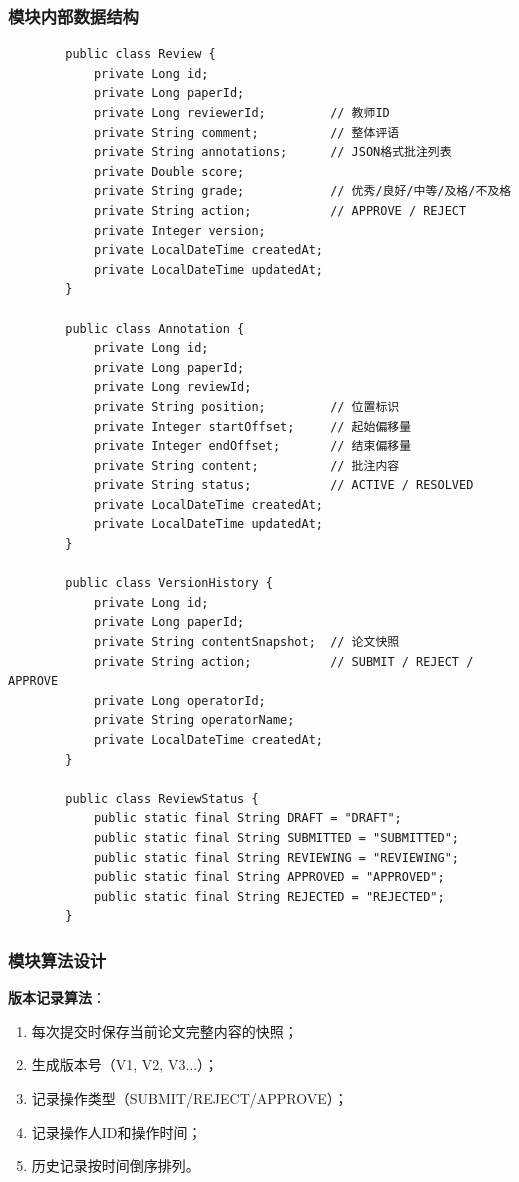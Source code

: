 \documentclass{../template/softeng}
\begin{document}
	\subsubsection{模块内部数据结构}
	\begin{verbatim}
		public class Review {
			private Long id;
			private Long paperId;
			private Long reviewerId;         // 教师ID
			private String comment;          // 整体评语
			private String annotations;      // JSON格式批注列表
			private Double score;
			private String grade;            // 优秀/良好/中等/及格/不及格
			private String action;           // APPROVE / REJECT
			private Integer version;
			private LocalDateTime createdAt;
			private LocalDateTime updatedAt;
		}

		public class Annotation {
			private Long id;
			private Long paperId;
			private Long reviewId;
			private String position;         // 位置标识
			private Integer startOffset;     // 起始偏移量
			private Integer endOffset;       // 结束偏移量
			private String content;          // 批注内容
			private String status;           // ACTIVE / RESOLVED
			private LocalDateTime createdAt;
			private LocalDateTime updatedAt;
		}

		public class VersionHistory {
			private Long id;
			private Long paperId;
			private String contentSnapshot;  // 论文快照
			private String action;           // SUBMIT / REJECT / APPROVE
			private Long operatorId;
			private String operatorName;
			private LocalDateTime createdAt;
		}

		public class ReviewStatus {
			public static final String DRAFT = "DRAFT";
			public static final String SUBMITTED = "SUBMITTED";
			public static final String REVIEWING = "REVIEWING";
			public static final String APPROVED = "APPROVED";
			public static final String REJECTED = "REJECTED";
		}
	\end{verbatim}

	\subsubsection{模块算法设计}
	\textbf{版本记录算法}：
	\begin{enumerate}
		\item 每次提交时保存当前论文完整内容的快照；
		\item 生成版本号（V1, V2, V3...）；
		\item 记录操作类型（SUBMIT/REJECT/APPROVE）；
		\item 记录操作人ID和操作时间；
		\item 历史记录按时间倒序排列。
	\end{enumerate}
\end{document}
